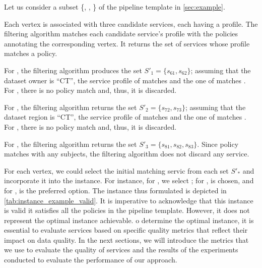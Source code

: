 \begin{example}[\bf \pipelineInstance]\label{ex:instance}

  Let us consider a subset \{, , \} of the pipeline template \tChartFunction in \cref{sec:example}.

  Each vertex is associated with three candidate services, each having a profile. The filtering algorithm matches each candidate service's profile with the policies annotating the corresponding vertex. It returns the set of services whose profile matches a policy.
  \begin{enumerate*}[label=\textit{\roman*})]
    \item For , the filtering algorithm produces the set $S'_1=\{s_{61},s_{62}\}$; assuming that the dataset owner is ``CT'', the service profile of  matches  and the one of  matches .
          For , there is no policy match and, thus, it is discarded.
    \item For , the filtering algorithm returns the set $S'_2=\{s_{72},s_{73}\}$; assuming that the dataset region is ``CT'', the service profile of  matches  and the one of  matches .
          For , there is no policy match and, thus, it is discarded.
    \item For , the filtering algorithm returns the set $S'_3=\{s_{81},s_{82},s_{83}\}$. Since policy  matches with any subjects, the filtering algorithm does not discard any service.
  \end{enumerate*}

  For each vertex, we could select the initial matching servic from each set $S'_*$ and incorporate it into the instance.
  For instance, for , we select ; for ,  is chosen, and for ,  is the preferred option.
  The instance thus formulated is depicted in \cref{tab:instance_example_valid}.
  It is imperative to acknowledge that this instance is valid it satisfies all the policies in the pipeline template.
  However, it does not represent the optimal instance achievable.
  o determine the optimal instance, it is essential to evaluate services based on specific quality metrics that reflect their impact on data quality.
  In the next sections, we will introduce the metrics that we use to evaluate the quality of services and the results of the experiments conducted to evaluate the performance of our approach.





\end{example}
